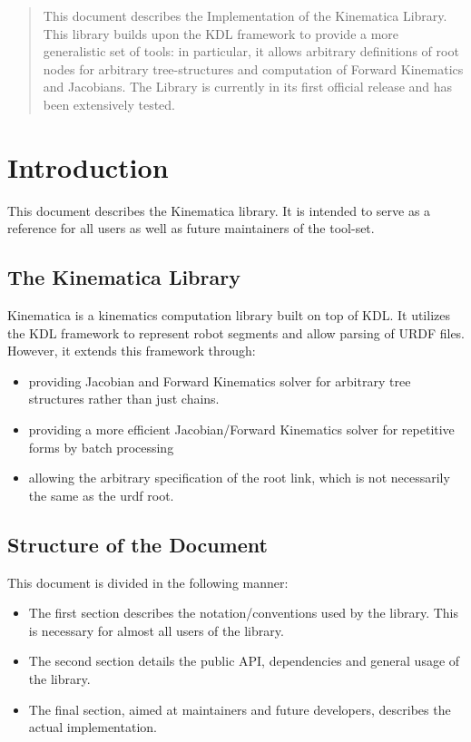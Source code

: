 \documentclass[12pt,a4paper,onecolumn]{article}
\begin{document}
\begin{abstract}
This document describes the Implementation of the Kinematica Library. This library builds upon the KDL framework to provide a more generalistic set of tools: in particular, it allows arbitrary definitions of root nodes for arbitrary tree-structures and computation of Forward Kinematics and Jacobians. The Library is currently in its first official release and has been extensively tested.
\end{abstract}

\newpage
\tableofcontents

\newpage
\section{Introduction}
\label{INTRODUCTION}
This document describes the Kinematica library. It is intended to serve as a reference for all users as well as future maintainers of the tool-set. 

\subsection{The Kinematica Library}
Kinematica is a kinematics computation library built on top of KDL. It utilizes the KDL framework to represent robot segments and allow parsing of URDF files. However, it extends this framework through:
\begin{itemize}
\item providing Jacobian and Forward Kinematics solver for arbitrary tree structures rather than just chains.
\item providing a more efficient Jacobian/Forward Kinematics solver for repetitive forms by batch processing
\item allowing the arbitrary specification of the root link, which is not necessarily the same as the urdf root.
\end{itemize}

\subsection{Structure of the Document}
This document is divided in the following manner:
\begin{itemize}
\item The first section describes the notation/conventions used by the library. This is necessary for almost all users of the library.
\item The second section details the public API, dependencies and general usage of the library.
\item The final section, aimed at maintainers and future developers, describes the actual implementation.
\end{itemize}
\end{document}
